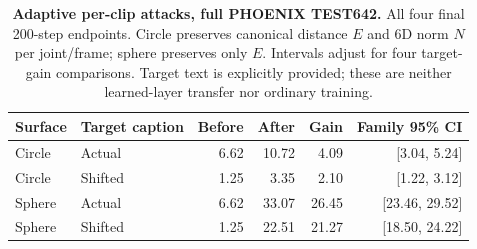 \begin{table}[t]\centering\small
\caption{\textbf{Adaptive per-clip attacks, full PHOENIX TEST642.} All four final 200-step endpoints. Circle preserves canonical distance $E$ and 6D norm $N$ per joint/frame; sphere preserves only $E$. Intervals adjust for four target-gain comparisons. Target text is explicitly provided; these are neither learned-layer transfer nor ordinary training.}
\label{tab:adaptivestats}
\begin{tabular}{llrrrr}\toprule
Surface & Target caption & Before & After & Gain & Family 95\% CI\\\midrule
Circle & Actual & 6.62 & 10.72 & 4.09 & [3.04, 5.24]\\
Circle & Shifted & 1.25 & 3.35 & 2.10 & [1.22, 3.12]\\
Sphere & Actual & 6.62 & 33.07 & 26.45 & [23.46, 29.52]\\
Sphere & Shifted & 1.25 & 22.51 & 21.27 & [18.50, 24.22]\\
\bottomrule\end{tabular}\end{table}
